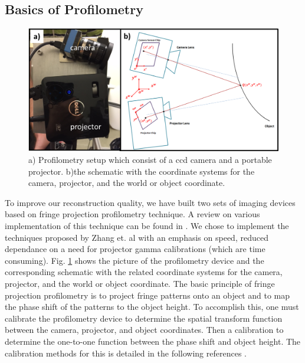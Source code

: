 \subsection{Basics of Profilometry}
\begin{figure}[ht]
\begin{center}
\includegraphics[width=14.5cm]{./figures/4_Gen3/profcoord.png}
\caption{a) Profilometry setup which consist of a ccd camera and a portable projector. b)the schematic with the coordinate systems for the camera, projector, and the world or object coordinate.}
\label{fig:profcoord}
\end{center}
\end{figure}
To improve our reconstruction quality, we have built two sets of imaging devices based on fringe projection profilometry technique. A review on various implementation of this technique can be found in \cite{}. We chose to implement the techniques proposed by Zhang et. al \cite{Zhang2006} with an emphasis on speed, reduced dependance on a need for projector gamma calibrations (which are time consuming). 
Fig. \ref{fig:profcoord} shows the picture of the profilometry device and the corresponding schematic with the related coordinate systems for the camera, projector, and the world or object coordinate. The basic principle of fringe projection profilometry is to project fringe patterns onto an object and to map the phase shift of the patterns to the object height. To accomplish this, one must calibrate the profilometry device to determine the spatial transform function between the camera, projector, and object coordinates. Then a calibration to determine the one-to-one function between the phase shift and object height. The calibration methods for this is detailed in the following references \cite{Peng2007,Zhang2010,Gorthi2010,Geng2011}.


